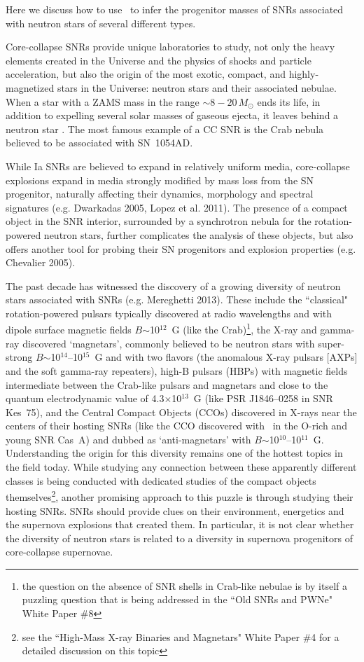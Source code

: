 \documentclass[11pt,a4paper]{article}
\begin{document}
Here we discuss how to use \ah\ to infer the progenitor masses of SNRs
associated with neutron stars of several different types.

Core-collapse SNRs provide unique laboratories to study, not only the
heavy elements created in the Universe and the physics of shocks and
particle acceleration, but also the origin of the most exotic,
compact, and highly-magnetized stars in the Universe: neutron stars
and their associated nebulae.
When a star with a ZAMS mass in the range $\sim 8-20\, M_\odot$ ends
its life, in addition to expelling several solar masses of gaseous
ejecta, it leaves behind a neutron star \citep{woosley02}. The most
famous example of a CC SNR is the Crab nebula believed to be
associated with SN~1054AD.

While Ia SNRs are believed to expand in relatively uniform media,
core-collapse explosions expand in media strongly modified by
mass loss from the SN progenitor, naturally affecting their
dynamics, morphology and spectral signatures (e.g. Dwarkadas 2005, Lopez et al. 2011). 
The presence of a compact object in the SNR interior, surrounded by a synchrotron nebula
for the rotation-powered neutron stars, further complicates
the analysis of these objects, but also offers another tool for probing
their SN progenitors and explosion properties (e.g. Chevalier 2005).

The past decade has witnessed the discovery of a growing diversity of
neutron stars associated with SNRs (e.g. Mereghetti 2013). These include the ``classical"
rotation-powered pulsars typically discovered at radio wavelengths and
with dipole surface magnetic fields $B$$\sim$10$^{12}$~G (like the
Crab)\footnote{the question on the absence of SNR shells in Crab-like
  nebulae is by itself a puzzling question that is being addressed in
  the ``Old SNRs and PWNe" White Paper \#8}, the X-ray and gamma-ray
discovered `magnetars', commonly believed to be neutron stars with
super-strong $B$$\sim$10$^{14}$--10$^{15}$~G and with two flavors (the
anomalous X-ray pulsars [AXPs] and the soft gamma-ray repeaters), high-B
pulsars (HBPs) with magnetic fields intermediate between the Crab-like
pulsars and magnetars and close to the quantum electrodynamic value of
4.3$\times$10$^{13}$~G (like PSR J1846--0258 in SNR Kes~75), and the
Central Compact Objects (CCOs) discovered in X-rays near the centers
of their hosting SNRs (like the CCO discovered with \chandra\ in the
O-rich and young SNR Cas~A) and dubbed as `anti-magnetars' with
$B$$\sim$10$^{10}$--10$^{11}$~G.  Understanding the origin for this
diversity remains one of the hottest topics in the field today. While
studying any connection between these apparently different classes is
being conducted with dedicated studies of the compact objects
themselves\footnote{see the ``High-Mass X-ray Binaries and Magnetars"
  White Paper \#4 for a detailed discussion on this topic}, another promising
approach to this puzzle is through studying their hosting SNRs.  SNRs
should provide clues on their environment, energetics and the
supernova explosions that created them.  In particular, it is not
clear whether the diversity of neutron stars is related to a diversity
in supernova progenitors of core-collapse supernovae.
\end{document}
